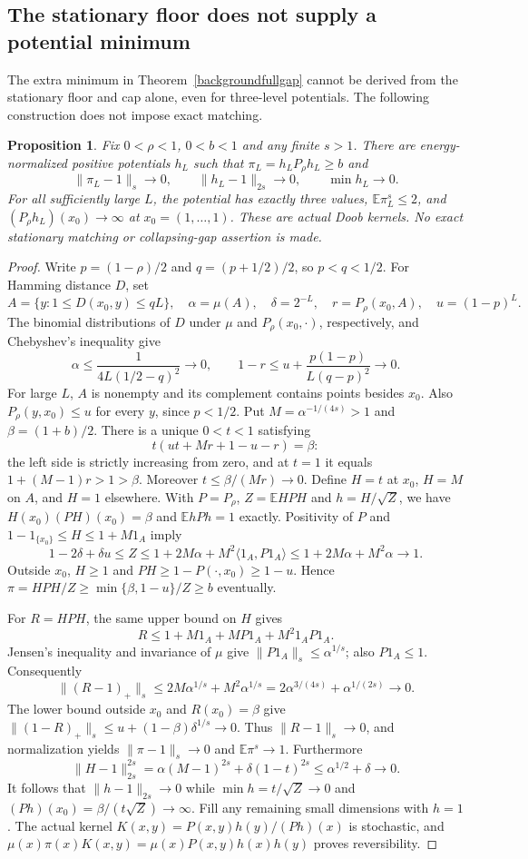 \documentclass[11pt]{article}
\newcommand{\E}{\mathbb E}
\newtheorem{proposition}[theorem]{Proposition}
\begin{document}
\subsection{The stationary floor does not supply a potential minimum}
The extra minimum in Theorem~\ref{backgroundfullgap} cannot be derived
from the stationary floor and cap alone, even for three-level potentials.
The following construction does not impose exact matching.
\begin{proposition}\label{vanishingminimum}
Fix $0<\rho<1$, $0<b<1$ and any finite $s>1$.
There are energy-normalized positive potentials $h_L$ such that
$\pi_L=h_LP_\rho h_L\geq b$ and
\[
 \|\pi_L-1\|_s\longrightarrow0,\qquad
 \|h_L-1\|_{2s}\longrightarrow0,\qquad
 \min h_L\longrightarrow0.
\]
For all sufficiently large $L$, the potential has exactly three values,
$\E\pi_L^s\leq2$, and $(P_\rho h_L)(x_0)\to\infty$ at
$x_0=(1,\ldots,1)$. These are actual Doob kernels. No exact stationary
matching or collapsing-gap assertion is made.
\end{proposition}
\begin{proof}
Write $p=(1-\rho)/2$ and $q=(p+1/2)/2$, so $p<q<1/2$.
For Hamming distance $D$, set
\[
 A=\{y:1\leq D(x_0,y)\leq qL\},\quad
 \alpha=\mu(A),\quad\delta=2^{-L},\quad
 r=P_\rho(x_0,A),\quad u=(1-p)^L.
\]
The binomial distributions of $D$ under $\mu$ and $P_\rho(x_0,\cdot)$,
respectively, and Chebyshev's inequality give
\[
 \alpha\leq\frac1{4L(1/2-q)^2}\to0,\qquad
 1-r\leq u+\frac{p(1-p)}{L(q-p)^2}\to0.
\]
For large $L$, $A$ is nonempty and its complement contains points besides
$x_0$. Also $P_\rho(y,x_0)\leq u$ for every $y$, since $p<1/2$.
Put $M=\alpha^{-1/(4s)}>1$ and $\beta=(1+b)/2$.
There is a unique $0<t<1$ satisfying
\[
 t(ut+Mr+1-u-r)=\beta:
\]
the left side is strictly increasing from zero, and at $t=1$ it equals
$1+(M-1)r>1>\beta$. Moreover $t\leq\beta/(Mr)\to0$.
Define $H=t$ at $x_0$, $H=M$ on $A$, and $H=1$ elsewhere.
With $P=P_\rho$, $Z=\E HPH$ and $h=H/\sqrt Z$, we have
$H(x_0)(PH)(x_0)=\beta$ and $\E hPh=1$ exactly.
Positivity of $P$ and $1-1_{\{x_0\}}\leq H\leq1+M1_A$ imply
\[
 1-2\delta+\delta u\leq Z
 \leq1+2M\alpha+M^2\langle1_A,P1_A\rangle
 \leq1+2M\alpha+M^2\alpha\longrightarrow1.
\]
Outside $x_0$, $H\geq1$ and $PH\geq1-P(\cdot,x_0)\geq1-u$.
Hence $\pi=HPH/Z\geq\min\{\beta,1-u\}/Z\geq b$ eventually.

For $R=HPH$, the same upper bound on $H$ gives
\[
 R\leq1+M1_A+MP1_A+M^2 1_A P1_A.
\]
Jensen's inequality and invariance of $\mu$ give
$\|P1_A\|_s\leq\alpha^{1/s}$; also $P1_A\leq1$.
Consequently
\[
 \|(R-1)_+\|_s\leq2M\alpha^{1/s}+M^2\alpha^{1/s}
 =2\alpha^{3/(4s)}+\alpha^{1/(2s)}\to0.
\]
The lower bound outside $x_0$ and $R(x_0)=\beta$ give
$\|(1-R)_+\|_s\leq u+(1-\beta)\delta^{1/s}\to0$.
Thus $\|R-1\|_s\to0$, and normalization yields
$\|\pi-1\|_s\to0$ and $\E\pi^s\to1$.
Furthermore
\[
 \|H-1\|_{2s}^{2s}
 =\alpha(M-1)^{2s}+\delta(1-t)^{2s}
 \leq\alpha^{1/2}+\delta\to0.
\]
It follows that $\|h-1\|_{2s}\to0$ while
$\min h=t/\sqrt Z\to0$ and
$(Ph)(x_0)=\beta/(t\sqrt Z)\to\infty$.
Fill any remaining small dimensions with $h=1$.
The actual kernel $K(x,y)=P(x,y)h(y)/(Ph)(x)$ is stochastic, and
$\mu(x)\pi(x)K(x,y)=\mu(x)P(x,y)h(x)h(y)$ proves reversibility.
\end{proof}
\end{document}
